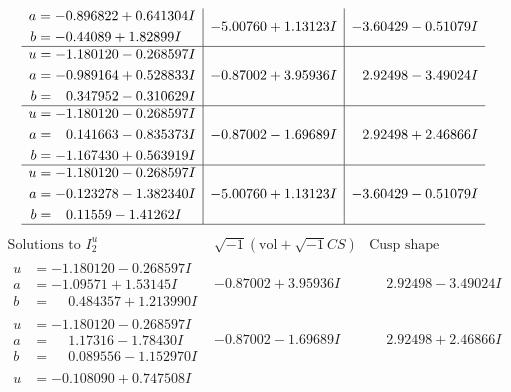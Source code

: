 \documentclass[1p]{elsarticle_modified}
\theoremstyle{definition}
\newcommand{\I}{\sqrt{-1}}
\begin{document}
$$\begin{array}{c|c|c}
\begin{aligned}
a &= -0.896822 + 0.641304 I \\
b &= -0.44089 + 1.82899 I\end{aligned}
 & -5.00760 + 1.13123 I & -3.60429 - 0.51079 I \\ \hline\begin{aligned}
u &= -1.180120 - 0.268597 I \\
a &= -0.989164 + 0.528833 I \\
b &= \phantom{-}0.347952 - 0.310629 I\end{aligned}
 & -0.87002 + 3.95936 I & \phantom{-}2.92498 - 3.49024 I \\ \hline\begin{aligned}
u &= -1.180120 - 0.268597 I \\
a &= \phantom{-}0.141663 - 0.835373 I \\
b &= -1.167430 + 0.563919 I\end{aligned}
 & -0.87002 - 1.69689 I & \phantom{-}2.92498 + 2.46866 I \\ \hline\begin{aligned}
u &= -1.180120 - 0.268597 I \\
a &= -0.123278 - 1.382340 I \\
b &= \phantom{-}0.11559 - 1.41262 I\end{aligned}
 & -5.00760 + 1.13123 I & -3.60429 - 0.51079 I\\
 \hline 
 \end{array}$$\newpage$$\begin{array}{c|c|c}  
\text{Solutions to }I^u_{2}& \I (\text{vol} + \sqrt{-1}CS) & \text{Cusp shape}\\
 \hline 
\begin{aligned}
u &= -1.180120 - 0.268597 I \\
a &= -1.09571 + 1.53145 I \\
b &= \phantom{-}0.484357 + 1.213990 I\end{aligned}
 & -0.87002 + 3.95936 I & \phantom{-}2.92498 - 3.49024 I \\ \hline\begin{aligned}
u &= -1.180120 - 0.268597 I \\
a &= \phantom{-}1.17316 - 1.78430 I \\
b &= \phantom{-}0.089556 - 1.152970 I\end{aligned}
 & -0.87002 - 1.69689 I & \phantom{-}2.92498 + 2.46866 I \\ \hline\begin{aligned}
u &= -0.108090 + 0.747508 I \\

\end{aligned}
\end{array}$$
\end{document}
